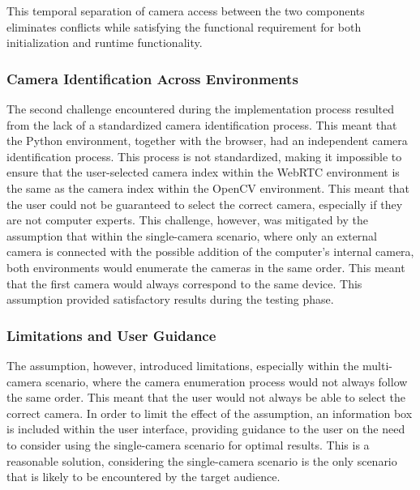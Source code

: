This temporal separation of camera access between the two components eliminates conflicts while satisfying the functional requirement for both initialization and runtime functionality.

\vspace{\baselineskip}

\subsubsection{Camera Identification Across Environments}
The second challenge encountered during the implementation process resulted from the lack of a standardized camera identification process. This meant that the Python environment, together with the browser, had an independent camera identification process. This process is not standardized, making it impossible to ensure that the user-selected camera index within the WebRTC environment is the same as the camera index within the OpenCV environment. This meant that the user could not be guaranteed to select the correct camera, especially if they are not computer experts. This challenge, however, was mitigated by the assumption that within the single-camera scenario, where only an external camera is connected with the possible addition of the computer's internal camera, both environments would enumerate the cameras in the same order. This meant that the first camera would always correspond to the same device. This assumption provided satisfactory results during the testing phase.

\subsubsection{Limitations and User Guidance}
The assumption, however, introduced limitations, especially within the multi-camera scenario, where the camera enumeration process would not always follow the same order. This meant that the user would not always be able to select the correct camera. In order to limit the effect of the assumption, an information box is included within the user interface, providing guidance to the user on the need to consider using the single-camera scenario for optimal results. This is a reasonable solution, considering the single-camera scenario is the only scenario that is likely to be encountered by the target audience.

